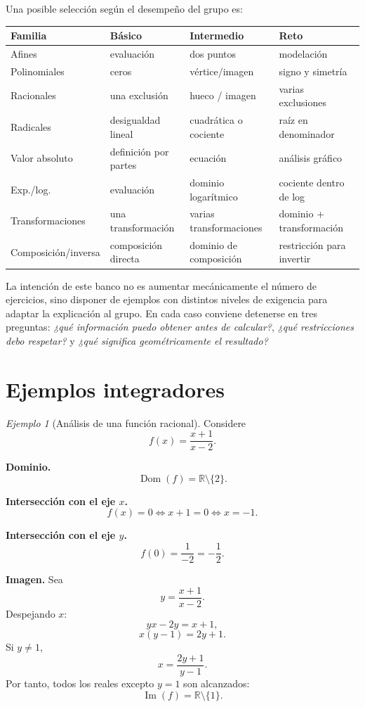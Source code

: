 \documentclass[12pt]{article}
\theoremstyle{remark}
\newtheorem{ejemplo}{Ejemplo}[section]
\newcommand{\R}{\mathbb{R}}
\newcommand{\Dom}{\operatorname{Dom}}
\newcommand{\Ima}{\operatorname{Im}}
\begin{document}
Una posible selección según el desempeño del grupo es:
\begin{center}
\begin{tabular}{p{}p{}p{}p{}}
\toprule
\textbf{Familia} & \textbf{Básico} & \textbf{Intermedio} & \textbf{Reto}\\
\midrule
Afines & evaluación & dos puntos & modelación\\
Polinomiales & ceros & vértice/imagen & signo y simetría\\
Racionales & una exclusión & hueco / imagen & varias exclusiones\\
Radicales & desigualdad lineal & cuadrática o cociente & raíz en denominador\\
Valor absoluto & definición por partes & ecuación & análisis gráfico\\
Exp./log. & evaluación & dominio logarítmico & cociente dentro de log\\
Transformaciones & una transformación & varias transformaciones & dominio + transformación\\
Composición/inversa & composición directa & dominio de composición & restricción para invertir\\
\bottomrule
\end{tabular}
\end{center}

La intención de este banco no es aumentar mecánicamente el número de ejercicios, sino disponer de ejemplos con distintos niveles de exigencia para adaptar la explicación al grupo. En cada caso conviene detenerse en tres preguntas: \emph{¿qué información puedo obtener antes de calcular?}, \emph{¿qué restricciones debo respetar?} y \emph{¿qué significa geométricamente el resultado?}


\section{Ejemplos integradores}

\begin{ejemplo}[Análisis de una función racional]
Considere
\[
f(x)=\frac{x+1}{x-2}.
\]

\textbf{Dominio.}
\[
\Dom(f)=\R\setminus\{2\}.
\]

\textbf{Intersección con el eje $x$.}
\[
f(x)=0
\Longleftrightarrow x+1=0
\Longleftrightarrow x=-1.
\]

\textbf{Intersección con el eje $y$.}
\[
f(0)=\frac{1}{-2}=-\frac12.
\]

\textbf{Imagen.}
Sea
\[
y=\frac{x+1}{x-2}.
\]
Despejando $x$:
\[
yx-2y=x+1,
\]
\[
x(y-1)=2y+1.
\]
Si $y\neq1$,
\[
x=\frac{2y+1}{y-1}.
\]
Por tanto, todos los reales excepto $y=1$ son alcanzados:
\[
\Ima(f)=\R\setminus\{1\}.
\]
\end{ejemplo}
\end{document}
